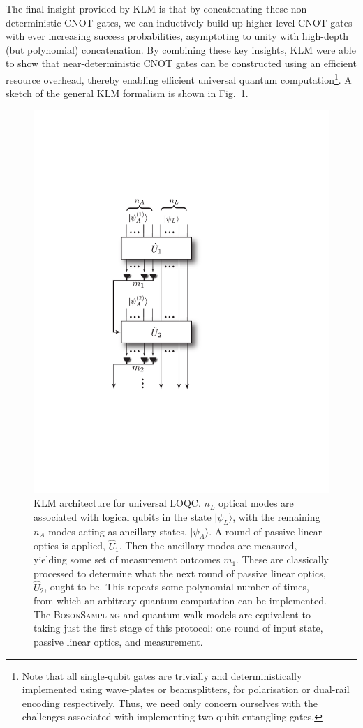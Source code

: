 \documentclass[aps, rmp, twocolumn, amsmath, amssymb, nofootinbib, superscriptaddress, longbibliography, floatfix, table-of-contents, eqsecnum]{revtex4-1}
\newcommand{\ket}[1]{|#1\rangle}
\begin{document}
The final insight provided by KLM is that by concatenating these non-deterministic CNOT gates, we can inductively build up higher-level CNOT gates with ever increasing success probabilities, asymptoting to unity with high-depth (but polynomial) concatenation. By combining these key insights, KLM were able to show that near-deterministic CNOT gates can be constructed using an efficient resource overhead, thereby enabling efficient universal quantum computation\footnote{Note that all single-qubit gates are trivially and deterministically implemented using wave-plates or beamsplitters, for polarisation or dual-rail encoding respectively. Thus, we need only concern ourselves with the challenges associated with implementing two-qubit entangling gates.}. A sketch of the general KLM formalism is shown in Fig.~\ref{fig:KLM_protocol}.

\begin{figure}[!htb]
\includegraphics[width=0.5\columnwidth]{KLM}
\caption{KLM architecture for universal LOQC. $n_L$ optical modes are associated with logical qubits in the state $\ket{\psi_L}$, with the remaining $n_A$ modes acting as ancillary states, $\ket{\psi_A}$. A round of passive linear optics is applied, $\hat{U}_1$. Then the ancillary modes are measured, yielding some set of measurement outcomes $m_1$. These are classically processed to determine what the next round of passive linear optics, $\hat{U}_2$, ought to be. This repeats some polynomial number of times, from which an arbitrary quantum computation can be implemented. The \textsc{BosonSampling} and quantum walk models are equivalent to taking just the first stage of this protocol: one round of input state, passive linear optics, and measurement.} \label{fig:KLM_protocol}
\end{figure}
\end{document}
